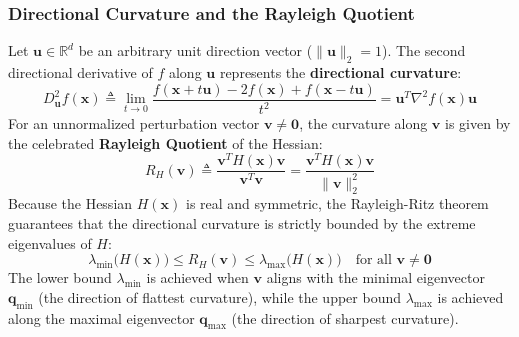 \subsubsection{Directional Curvature and the Rayleigh Quotient}
Let $\mathbf{u} \in \mathbb{R}^d$ be an arbitrary unit direction vector ($\|\mathbf{u}\|_2 = 1$). The second directional derivative of $f$ along $\mathbf{u}$ represents the \textbf{directional curvature}:
\begin{equation}
D^2_{\mathbf{u}} f(\mathbf{x}) \triangleq \lim_{t \to 0} \frac{f(\mathbf{x} + t\mathbf{u}) - 2f(\mathbf{x}) + f(\mathbf{x} - t\mathbf{u})}{t^2} = \mathbf{u}^T \nabla^2 f(\mathbf{x}) \mathbf{u}
\end{equation}
For an unnormalized perturbation vector $\mathbf{v} \ne \mathbf{0}$, the curvature along $\mathbf{v}$ is given by the celebrated \textbf{Rayleigh Quotient} of the Hessian:
\begin{equation}
R_H(\mathbf{v}) \triangleq \frac{\mathbf{v}^T H(\mathbf{x}) \mathbf{v}}{\mathbf{v}^T \mathbf{v}} = \frac{\mathbf{v}^T H(\mathbf{x}) \mathbf{v}}{\|\mathbf{v}\|_2^2}
\label{eq:rayleigh_quotient}
\end{equation}
Because the Hessian $H(\mathbf{x})$ is real and symmetric, the Rayleigh-Ritz theorem guarantees that the directional curvature is strictly bounded by the extreme eigenvalues of $H$:
\begin{equation}
\lambda_{\min}\big(H(\mathbf{x})\big) \le R_H(\mathbf{v}) \le \lambda_{\max}\big(H(\mathbf{x})\big) \quad \text{for all } \mathbf{v} \ne \mathbf{0}
\end{equation}
The lower bound $\lambda_{\min}$ is achieved when $\mathbf{v}$ aligns with the minimal eigenvector $\mathbf{q}_{\min}$ (the direction of flattest curvature), while the upper bound $\lambda_{\max}$ is achieved along the maximal eigenvector $\mathbf{q}_{\max}$ (the direction of sharpest curvature).

